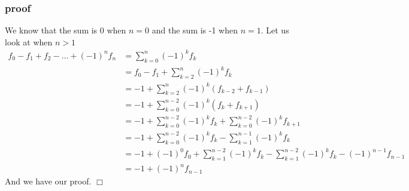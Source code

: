\documentclass{article}
\begin{document}
\begin{enumerate}
\begin{enumerate}
\subsubsection*{proof}
We know that the sum is 0 when $n=0$ and the sum is -1 when $n=1$. Let us look at when $n>1$
\begin{align*}
  f_0-f_1+f_2-\dots+(-1)^nf_{n}&=\sum\limits_{k=0}^n{(-1)^kf_k}\\
  &=f_0-f_1+\sum\limits_{k=2}^n{(-1)^kf_k}\\
  &=-1+\sum\limits_{k=2}^n{(-1)^k(f_{k-2}+f_{k-1})}\\
  &=-1+\sum\limits_{k=0}^{n-2}{(-1)^k(f_{k}+f_{k+1})}\\
  &=-1+\sum\limits_{k=0}^{n-2}{(-1)^kf_{k}}+\sum\limits_{k=0}^{n-2}{(-1)^kf_{k+1}}\\
  &=-1+\sum\limits_{k=0}^{n-2}{(-1)^kf_{k}}-\sum\limits_{k=1}^{n-1}{(-1)^kf_{k}}\\
  &=-1+(-1)^0f_0+\sum\limits_{k=1}^{n-2}{(-1)^kf_{k}}-\sum\limits_{k=1}^{n-2}{(-1)^kf_{k}}-(-1)^{n-1}f_{n-1}\\
  &=-1+(-1)^nf_{n-1}
\end{align*}
And we have our proof. $\Box$

\end{enumerate}
\end{enumerate}
\end{document}
